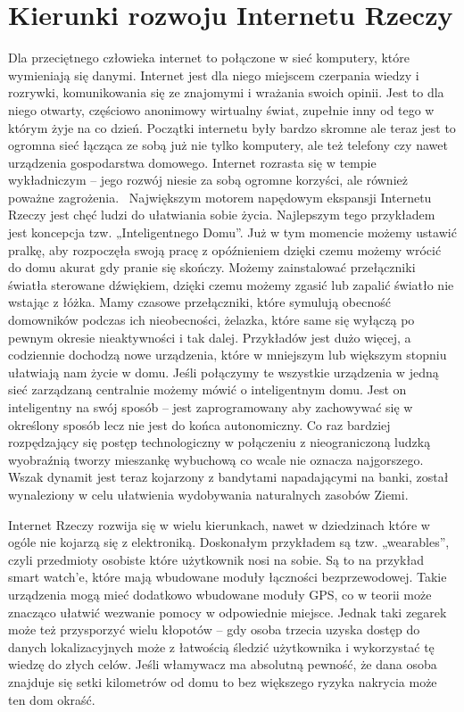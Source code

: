 \documentclass[brudnopis]{xmgr}
\begin{document}
\chapter{Kierunki rozwoju Internetu Rzeczy}
Dla przeciętnego człowieka internet to połączone w sieć komputery, które wymieniają się danymi. Internet jest dla niego miejscem czerpania wiedzy i rozrywki, komunikowania się ze znajomymi i wrażania swoich opinii. Jest to dla niego otwarty, częściowo anonimowy wirtualny świat, zupełnie inny od tego w którym żyje na co dzień. Początki internetu były bardzo skromne ale teraz jest to ogromna sieć łącząca ze sobą już nie tylko komputery, ale też telefony czy nawet urządzenia gospodarstwa domowego. Internet rozrasta się w tempie wykładniczym – jego rozwój niesie za sobą ogromne korzyści, ale również poważne zagrożenia.~\cite{Nsr:2015:CMC}
Największym motorem napędowym ekspansji Internetu Rzeczy jest chęć ludzi do ułatwiania sobie życia. Najlepszym tego przykładem jest koncepcja tzw. „Inteligentnego Domu”. Już w tym momencie możemy ustawić pralkę, aby rozpoczęła swoją pracę z opóźnieniem dzięki czemu możemy wrócić do domu akurat gdy pranie się skończy. Możemy zainstalować przełączniki światła sterowane dźwiękiem, dzięki czemu możemy zgasić lub zapalić światło nie wstając z łóżka. Mamy czasowe przełączniki, które symulują obecność domowników podczas ich nieobecności, żelazka, które same się wyłączą po pewnym okresie nieaktywności i tak dalej. Przykładów jest dużo więcej, a codziennie dochodzą nowe urządzenia, które w mniejszym lub większym stopniu ułatwiają nam życie w domu. Jeśli połączymy te wszystkie urządzenia w jedną sieć zarządzaną centralnie możemy mówić o inteligentnym domu. Jest on inteligentny na swój sposób – jest zaprogramowany aby zachowywać się w określony sposób lecz nie jest do końca autonomiczny. Co raz bardziej rozpędzający się postęp technologiczny w połączeniu z nieograniczoną ludzką wyobraźnią tworzy mieszankę wybuchową co wcale nie oznacza najgorszego. Wszak dynamit jest teraz kojarzony z bandytami napadającymi na banki, został wynaleziony w celu ułatwienia wydobywania naturalnych zasobów Ziemi.

Internet Rzeczy rozwija się w wielu kierunkach, nawet w dziedzinach które w ogóle nie kojarzą się z elektroniką. Doskonałym przykładem są tzw. „wearables”, czyli przedmioty osobiste które użytkownik nosi na sobie. Są to na przykład smart watch'e, które mają wbudowane moduły łączności bezprzewodowej.  Takie urządzenia mogą mieć dodatkowo wbudowane moduły GPS, co w teorii może znacząco ułatwić wezwanie pomocy w odpowiednie miejsce. Jednak taki zegarek może też przysporzyć wielu kłopotów – gdy osoba trzecia uzyska dostęp do danych lokalizacyjnych  może z łatwością śledzić użytkownika i wykorzystać tę wiedzę do złych celów. Jeśli włamywacz ma absolutną pewność, że dana osoba znajduje się setki kilometrów od domu to bez większego ryzyka nakrycia może ten dom okraść.
\end{document}
